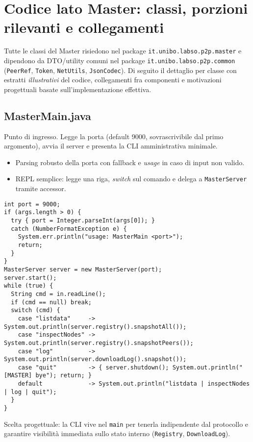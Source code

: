 \documentclass[a4paper,12pt]{article}
\begin{document}
\appendix

\section{Codice lato Master: classi, porzioni rilevanti e collegamenti}

Tutte le classi del Master risiedono nel package \texttt{it.unibo.labso.p2p.master} e dipendono da DTO/utility comuni nel package \texttt{it.unibo.labso.p2p.common} (\texttt{PeerRef}, \texttt{Token}, \texttt{NetUtils}, \texttt{JsonCodec}). Di seguito il dettaglio per classe con estratti \emph{illustrativi} del codice, collegamenti fra componenti e motivazioni progettuali basate sull’implementazione effettiva.

\subsection*{MasterMain.java}
Punto di ingresso. Legge la porta (default 9000, sovrascrivibile dal primo argomento), avvia il server e presenta la CLI amministrativa minimale.
\begin{itemize}[nosep]
  \item Parsing robusto della porta con fallback e \emph{usage} in caso di input non valido.
  \item REPL semplice: legge una riga, \emph{switch} sul comando e delega a \texttt{MasterServer} tramite accessor.
\end{itemize}

\begin{lstlisting}
int port = 9000;
if (args.length > 0) {
  try { port = Integer.parseInt(args[0]); }
  catch (NumberFormatException e) {
    System.err.println("usage: MasterMain <port>");
    return;
  }
}
MasterServer server = new MasterServer(port);
server.start();
while (true) {
  String cmd = in.readLine();
  if (cmd == null) break;
  switch (cmd) {
    case "listdata"     -> System.out.println(server.registry().snapshotAll());
    case "inspectNodes" -> System.out.println(server.registry().snapshotPeers());
    case "log"          -> System.out.println(server.downloadLog().snapshot());
    case "quit"         -> { server.shutdown(); System.out.println("[MASTER] bye"); return; }
    default             -> System.out.println("listdata | inspectNodes | log | quit");
  }
}
\end{lstlisting}

Scelta progettuale: la CLI vive nel \texttt{main} per tenerla indipendente dal protocollo e garantire visibilità immediata sullo stato interno (\texttt{Registry}, \texttt{DownloadLog}).
\end{document}
